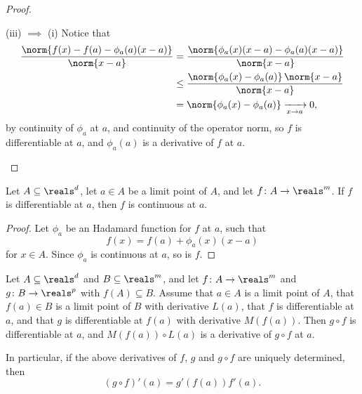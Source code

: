 \documentclass[article, a4paper, 11pt, oneside]{memoir}
\numberwithin{equation}{chapter}
\begin{document}
\begin{proof}
\begin{proofsec}
        \item[(iii) $\implies$ (i)]
        Notice that
        \begin{align*}
            \frac{\norm{f(x) - f(a) - \phi_a(a)(x-a)}}{\norm{x-a}}
                &= \frac{\norm{\phi_a(x)(x-a) - \phi_a(a)(x-a)}}{\norm{x-a}} \\
                &\leq \frac{\norm{\phi_a(x) - \phi_a(a)} \, \norm{x-a}}{\norm{x-a}} \\
                &= \norm{\phi_a(x) - \phi_a(a)}
                \xrightarrow[x \to a]{} 0,
        \end{align*}
        by continuity of $\phi_a$ at $a$, and continuity of the operator norm, so $f$ is differentiable at $a$, and $\phi_a(a)$ is a derivative of $f$ at $a$.
    \end{proofsec}
\end{proof}


\begin{proposition}
    \label{prop:differentiable-implies-continuous}
    Let $A \subseteq \reals^d$, let $a \in A$ be a limit point of $A$, and let $f \colon A \to \reals^m$. If $f$ is differentiable at $a$, then $f$ is continuous at $a$.
\end{proposition}

\begin{proof}
    Let $\phi_a$ be an Hadamard function for $f$ at $a$, such that
    \begin{equation}
        f(x)
            = f(a) + \phi_a(x)(x-a)
    \end{equation}
    for $x \in A$. Since $\phi_a$ is continuous at $a$, so is $f$.
\end{proof}


\begin{theorem}
    Let $A \subseteq \reals^d$ and $B \subseteq \reals^m$, and let $f \colon A \to \reals^m$ and $g \colon B \to \reals^p$ with $f(A) \subseteq B$. Assume that $a \in A$ is a limit point of $A$, that $f(a) \in B$ is a limit point of $B$ with derivative $L(a)$, that $f$ is differentiable at $a$, and that $g$ is differentiable at $f(a)$ with derivative $M(f(a))$. Then $g \circ f$ is differentiable at $a$, and $M(f(a)) \circ L(a)$ is a derivative of $g \circ f$ at $a$.

    In particular, if the above derivatives of $f$, $g$ and $g \circ f$ are uniquely determined, then
    \begin{equation*}
        (g \circ f)'(a)
            = g'(f(a)) f'(a).
    \end{equation*}
\end{theorem}
\end{document}
